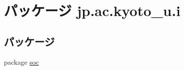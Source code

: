 \hypertarget{namespacejp_1_1ac_1_1kyoto__u_1_1i}{\section{パッケージ jp.\-ac.\-kyoto\-\_\-u.\-i}
\label{namespacejp_1_1ac_1_1kyoto__u_1_1i}
}
\subsection*{パッケージ}
\begin{DoxyCompactItemize}
\item 
package \hyperlink{namespacejp_1_1ac_1_1kyoto__u_1_1i_1_1soc}{soc}
\end{DoxyCompactItemize}
